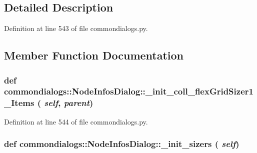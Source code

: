 \subsection{Detailed Description}




Definition at line 543 of file commondialogs.py.

\subsection{Member Function Documentation}
\hypertarget{classcommondialogs_1_1NodeInfosDialog_d776e64e7aaaecb9ad798efe80588506}{
\subsubsection[\_\-init\_\-coll\_\-flexGridSizer1\_\-Items]{\setlength{\rightskip}{0pt plus 5cm}def commondialogs::Node\-Infos\-Dialog::\_\-init\_\-coll\_\-flex\-Grid\-Sizer1\_\-Items ( {\em self},  {\em parent})}}
\label{classcommondialogs_1_1NodeInfosDialog_d776e64e7aaaecb9ad798efe80588506}




Definition at line 544 of file commondialogs.py.\hypertarget{classcommondialogs_1_1NodeInfosDialog_729b0b3de672a39d4066b2d68523bf93}{
\subsubsection[\_\-init\_\-sizers]{\setlength{\rightskip}{0pt plus 5cm}def commondialogs::Node\-Infos\-Dialog::\_\-init\_\-sizers ( {\em self})}}
\label{classcommondialogs_1_1NodeInfosDialog_729b0b3de672a39d4066b2d68523bf93}





